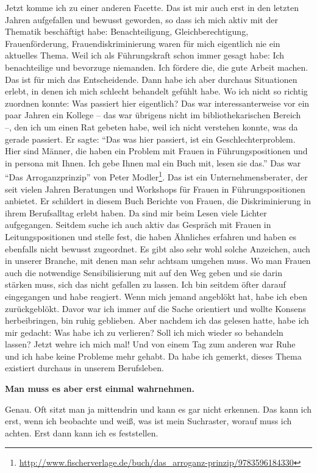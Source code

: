 \documentclass[a4paper,
fontsize=11pt,
oneside,
numbers=noperiodatend,
parskip=half-,
bibliography=totoc,
final
]{scrartcl}
\begin{document}
Jetzt komme ich zu einer anderen Facette. Das ist mir auch erst in den
letzten Jahren aufgefallen und bewusst geworden, so dass ich mich aktiv
mit der Thematik beschäftigt habe: Benachteiligung, Gleichberechtigung,
Frauenförderung, Frauendiskriminierung waren für mich eigentlich nie ein
aktuelles Thema. Weil ich als Führungskraft schon immer gesagt habe: Ich
benachteilige und bevorzuge niemanden. Ich fördere die, die gute Arbeit
machen. Das ist für mich das Entscheidende. Dann habe ich aber durchaus
Situationen erlebt, in denen ich mich schlecht behandelt gefühlt habe.
Wo ich nicht so richtig zuordnen konnte: Was passiert hier eigentlich?
Das war interessanterweise vor ein paar Jahren ein Kollege -- das war
übrigens nicht im bibliothekarischen Bereich~ --, den ich um einen Rat
gebeten habe, weil ich nicht verstehen konnte, was da gerade passiert.
Er sagte: \enquote{Das was hier passiert, ist ein Geschlechterproblem.
Hier sind Männer, die haben ein Problem mit Frauen in Füh\-rungs\-po\-si\-tionen und in persona mit Ihnen. Ich gebe Ihnen mal ein Buch mit, lesen sie
das.} Das war \enquote{Das Arroganzprinzip} von Peter Modler\footnote{\url{http://www.fischerverlage.de/buch/das_arroganz-prinzip/9783596184330}}.
Das ist ein Unternehmensberater, der seit vielen Jahren Beratungen und
Workshops für Frauen in Füh\-rungs\-po\-si\-tionen anbietet. Er schildert in
diesem Buch Berichte von Frauen, die Diskriminierung in ihrem
Berufsalltag erlebt haben. Da sind mir beim Lesen viele Lichter
aufgegangen. Seitdem suche ich auch aktiv das Gespräch mit Frauen in
Leitungspositionen und stelle fest, die haben Ähnliches erfahren und
haben es ebenfalls nicht bewusst zugeordnet. Es gibt also sehr wohl
solche Anzeichen, auch in unserer Branche, mit denen man sehr achtsam
umgehen muss. Wo man Frauen auch die notwendige Sensibilisierung mit auf
den Weg geben und sie darin stärken muss, sich das nicht gefallen zu
lassen. Ich bin seitdem öfter darauf eingegangen und habe reagiert. Wenn
mich jemand angeblökt hat, habe ich eben zurückgeblökt. Davor war ich
immer auf die Sache orientiert und wollte Konsens herbeibringen, bin
ruhig geblieben. Aber nachdem ich das gelesen hatte, habe ich mir
gedacht: Was habe ich zu verlieren? Soll ich mich wieder so behandeln
lassen? Jetzt wehre ich mich mal! Und von einem Tag zum anderen war Ruhe
und ich habe keine Probleme mehr gehabt. Da habe ich gemerkt, dieses
Thema existiert durchaus in unserem Berufsleben.

\textbf{Man muss es aber erst einmal wahrnehmen.}

Genau. Oft sitzt man ja mittendrin und kann es gar nicht erkennen. Das
kann ich erst, wenn ich beobachte und weiß, was ist mein Suchraster,
worauf muss ich achten. Erst dann kann ich es feststellen.
\end{document}
